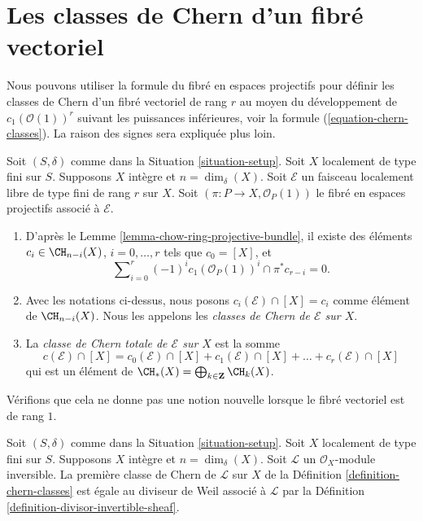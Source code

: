 \section{Les classes de Chern d'un fibré vectoriel}
\label{section-chern-classes-vector-bundles}

\noindent
Nous pouvons utiliser la formule du fibré en espaces projectifs pour définir les
classes de Chern d'un fibré vectoriel de rang $r$ au moyen du développement
de $c_1(\mathcal{O}(1))^r$ suivant les puissances inférieures, voir
la formule (\ref{equation-chern-classes}).
La raison des signes sera expliquée plus loin.

\begin{definition}
\label{definition-chern-classes}
Soit $(S, \delta)$ comme dans la Situation \ref{situation-setup}.
Soit $X$ localement de type fini sur $S$.
Supposons $X$ intègre et $n = \dim_\delta(X)$.
Soit $\mathcal{E}$ un faisceau localement libre de type fini de rang $r$
sur $X$. Soit $(\pi : P \to X, \mathcal{O}_P(1))$ le fibré en espaces
projectifs associé à $\mathcal{E}$.
\begin{enumerate}
\item D'après le Lemme \ref{lemma-chow-ring-projective-bundle}, il existe des
éléments $c_i \in \CH_{n - i}(X)$, $i = 0, \ldots, r$
tels que $c_0 = [X]$, et
\begin{equation}
\label{equation-chern-classes}
\sum\nolimits_{i = 0}^r
(-1)^i c_1(\mathcal{O}_P(1))^i \cap \pi^*c_{r - i}
= 0.
\end{equation}
\item Avec les notations ci-dessus, nous posons
$c_i(\mathcal{E}) \cap [X] = c_i$
comme élément de $\CH_{n - i}(X)$.
Nous les appelons les {\it classes de Chern de $\mathcal{E}$ sur $X$}.
\item La {\it classe de Chern totale de $\mathcal{E}$ sur $X$}
est la somme
$$
c({\mathcal E}) \cap [X] =
c_0({\mathcal E}) \cap [X]
+ c_1({\mathcal E}) \cap [X] + \ldots
+ c_r({\mathcal E}) \cap [X]
$$
qui est un élément de
$\CH_*(X) = \bigoplus_{k \in \mathbf{Z}} \CH_k(X)$.
\end{enumerate}
\end{definition}

\noindent
Vérifions que cela ne donne pas une notion nouvelle lorsque le
fibré vectoriel est de rang $1$.

\begin{lemma}
\label{lemma-first-chern-class}
Soit $(S, \delta)$ comme dans la Situation \ref{situation-setup}.
Soit $X$ localement de type fini sur $S$.
Supposons $X$ intègre et $n = \dim_\delta(X)$.
Soit $\mathcal{L}$ un $\mathcal{O}_X$-module inversible.
La première classe de Chern de $\mathcal{L}$ sur $X$ de la
Définition \ref{definition-chern-classes}
est égale au diviseur de Weil associé à $\mathcal{L}$
par la Définition \ref{definition-divisor-invertible-sheaf}.
\end{lemma}

